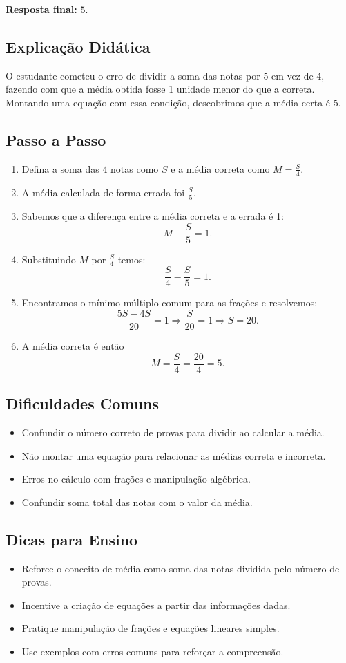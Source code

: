 \documentclass{article}
\begin{document}
\textbf{Resposta final:} $\boxed{5}$.

\subsection*{Explicação Didática}

O estudante cometeu o erro de dividir a soma das notas por 5 em vez de 4, fazendo com que a média obtida fosse 1 unidade menor do que a correta. Montando uma equação com essa condição, descobrimos que a média certa é 5.

\subsection*{Passo a Passo}

\begin{enumerate}
  \item Defina a soma das 4 notas como $S$ e a média correta como $M = \frac{S}{4}$.
  \item A média calculada de forma errada foi $\frac{S}{5}$.
  \item Sabemos que a diferença entre a média correta e a errada é 1:
  \[
    M - \frac{S}{5} = 1.
  \]
  \item Substituindo $M$ por $\frac{S}{4}$ temos:
  \[
    \frac{S}{4} - \frac{S}{5} = 1.
  \]
  \item Encontramos o mínimo múltiplo comum para as frações e resolvemos:
  \[
    \frac{5S - 4S}{20} = 1 \Rightarrow \frac{S}{20} = 1 \Rightarrow S = 20.
  \]
  \item A média correta é então
  \[
    M = \frac{S}{4} = \frac{20}{4} = 5.
  \]
\end{enumerate}

\subsection*{Dificuldades Comuns}
\begin{itemize}
  \item Confundir o número correto de provas para dividir ao calcular a média.
  \item Não montar uma equação para relacionar as médias correta e incorreta.
  \item Erros no cálculo com frações e manipulação algébrica.
  \item Confundir soma total das notas com o valor da média.
\end{itemize}

\subsection*{Dicas para Ensino}
\begin{itemize}
  \item Reforce o conceito de média como soma das notas dividida pelo número de provas.
  \item Incentive a criação de equações a partir das informações dadas.
  \item Pratique manipulação de frações e equações lineares simples.
  \item Use exemplos com erros comuns para reforçar a compreensão.
\end{itemize}
\end{document}
